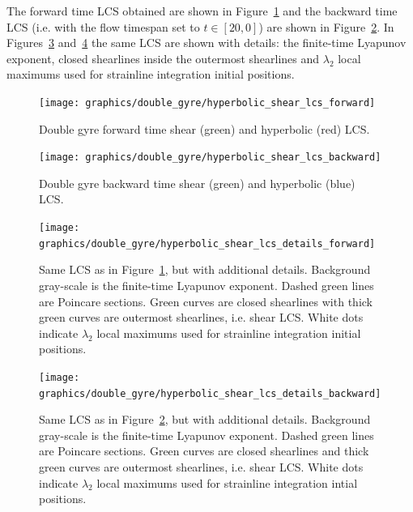\documentclass{article}
\begin{document}
The forward time LCS obtained are shown in Figure~\ref{f:double gyre hyperbolic shear lcs forward} and the backward time LCS (i.e. with the flow timespan set to $t \in [20,0]$) are shown in Figure~\ref{f:double gyre hyperbolic shear lcs backward}. In Figures~\ref{f:double gyre hyperbolic shear lcs details forward} and~\ref{f:double gyre hyperbolic shear lcs details backward} the same LCS are shown with details: the finite-time Lyapunov exponent, closed shearlines inside the outermost shearlines and $\lambda_2$ local maximums used for strainline integration initial positions.

\begin{figure}
\begin{center}
\texttt{[image: graphics/double\_gyre/hyperbolic\_shear\_lcs\_forward]}
\end{center}
\caption{Double gyre forward time shear (green) and hyperbolic (red) LCS.}
\label{f:double gyre hyperbolic shear lcs forward}
\end{figure}

\begin{figure}
\begin{center}
\texttt{[image: graphics/double\_gyre/hyperbolic\_shear\_lcs\_backward]}
\end{center}
\caption{Double gyre backward time shear (green) and hyperbolic (blue) LCS.}
\label{f:double gyre hyperbolic shear lcs backward}
\end{figure}

\begin{figure}
\begin{center}
\texttt{[image: graphics/double\_gyre/hyperbolic\_shear\_lcs\_details\_forward]}
\end{center}
\caption{Same LCS as in Figure~\ref{f:double gyre hyperbolic shear lcs forward}, but with additional details. Background gray-scale is the finite-time Lyapunov exponent. Dashed green lines are Poincare sections. Green curves are closed shearlines with thick green curves are outermost shearlines, i.e. shear LCS. White dots indicate $\lambda_2$ local maximums used for strainline integration initial positions.}
\label{f:double gyre hyperbolic shear lcs details forward}
\end{figure}

\begin{figure}
\begin{center}
\texttt{[image: graphics/double\_gyre/hyperbolic\_shear\_lcs\_details\_backward]}
\end{center}
\caption{Same LCS as in Figure~\ref{f:double gyre hyperbolic shear lcs backward}, but with additional details. Background gray-scale is the finite-time Lyapunov exponent. Dashed green lines are Poincare sections. Green curves are closed shearlines and thick green curves are outermost shearlines, i.e. shear LCS. White dots indicate $\lambda_2$ local maximums used for strainline integration intial positions.}
\label{f:double gyre hyperbolic shear lcs details backward}
\end{figure}
\end{document}

